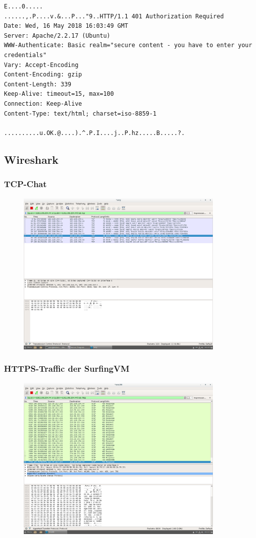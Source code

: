 \documentclass[12pt]{article}
\theoremstyle{plain}
\begin{document}
\begin{lstlisting}
E....0.....	
......,.P....v.&...P..."9..HTTP/1.1 401 Authorization Required
Date: Wed, 16 May 2018 16:03:49 GMT
Server: Apache/2.2.17 (Ubuntu)
WWW-Authenticate: Basic realm="secure content - you have to enter your credentials"
Vary: Accept-Encoding
Content-Encoding: gzip
Content-Length: 339
Keep-Alive: timeout=15, max=100
Connection: Keep-Alive
Content-Type: text/html; charset=iso-8859-1

..........u.OK.@....).^.P.I....j..P.hz.....B.....?.
\end{lstlisting}
\subsection*{Wireshark}
\subsubsection*{TCP-Chat}
\begin{figure}[!ht]
	\centering
     \includegraphics[width=0.9\textwidth]{Bilder/tcp-chat_1.png}
\end{figure}
\newpage
\subsubsection*{HTTPS-Traffic der SurfingVM}
\begin{figure}[!ht]
	\centering
     \includegraphics[width=0.9\textwidth]{Bilder/https_traffic_surfingvm.png}
\end{figure}
\end{document}
